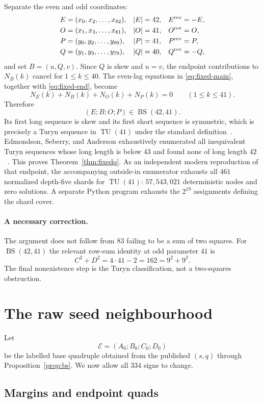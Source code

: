 \documentclass[11pt]{article}
\newcommand{\BS}{\operatorname{BS}}
\newcommand{\TU}{\operatorname{TU}}
\begin{document}
Separate the even and odd coordinates:
\begin{align*}
 E&=(x_0,x_2,\ldots,x_{82}), & |E|&=42,& E^{\rm rev}&=-E,\\
 O&=(x_1,x_3,\ldots,x_{81}), & |O|&=41,& O^{\rm rev}&=O,\\
 P&=(y_0,y_2,\ldots,y_{80}), & |P|&=41,& P^{\rm rev}&=P,\\
 Q&=(y_1,y_3,\ldots,y_{79}), & |Q|&=40,& Q^{\rm rev}&=-Q,
\end{align*}
and set $B=(u,Q,v)$.  Since $Q$ is skew and $u=v$, the endpoint
contributions to $N_B(k)$ cancel for $1\le k\le40$.  The even-lag equations
in \eqref{eq:fixed-main}, together with \eqref{eq:fixed-end}, become
\[
 N_E(k)+N_B(k)+N_O(k)+N_P(k)=0
 \qquad(1\le k\le41).
\]
Therefore
\[
 (E;B;O;P)\in\BS(42,41).
\]
Its first long sequence is skew and its first short sequence is symmetric,
which is precisely a Turyn sequence in $\TU(41)$ under the standard
definition~\cite{djokovic-quadruples}.  Edmondson, Seberry, and Anderson
exhaustively enumerated all inequivalent Turyn sequences whose long length
is below $43$ and found none of long length $42$~\cite{edmondson}.
This proves Theorem~\ref{thm:fixedq}.  As an independent modern
reproduction of that endpoint, the accompanying outside-in enumerator
exhausts all $461$ normalized depth-five shards for $\TU(41)$:
$57{,}543{,}021$ deterministic nodes and zero solutions.  A separate Python
program exhausts the $2^{19}$ assignments defining the shard cover.

\paragraph{A necessary correction.}
The argument does not follow from $83$ failing to be a sum of two squares.
For $\BS(42,41)$ the relevant row-sum identity at odd parameter $41$ is
\[
 C^2+D^2=4\cdot41-2=162=9^2+9^2.
\]
The final nonexistence step is the Turyn classification, not a two-squares
obstruction.

\section{The raw seed neighbourhood}

Let
\[
 \mathcal E=(A_0;B_0;C_0;D_0)
\]
be the labelled base quadruple obtained from the published $(s,q)$ through
Proposition~\ref{prop:bs}.  We now allow all $334$ signs to change.

\subsection{Margins and endpoint quads}
\end{document}

